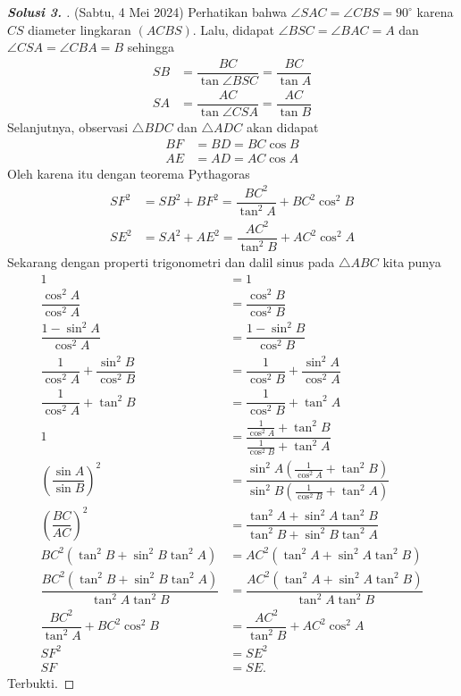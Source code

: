 \documentclass[letterpaper, 13pt]{scrartcl}
\begin{document}
\begin{proof}[\textbf{Solusi 3. }] (Sabtu, 4 Mei 2024)
Perhatikan bahwa $\angle SAC = \angle CBS = 90^\circ$ karena $CS$ diameter lingkaran $(ACBS)$. Lalu, didapat $\angle BSC = \angle BAC = A$ dan $\angle CSA = \angle CBA = B$ sehingga
\begin{align*}
    SB &= \dfrac{BC}{\tan \angle BSC} = \dfrac{BC}{\tan A}\\
    SA &= \dfrac{AC}{\tan \angle CSA} = \dfrac{AC}{\tan B}
\end{align*}
Selanjutnya, observasi $\triangle BDC$ dan $\triangle ADC$ akan didapat
\begin{align*}
    BF &= BD = BC \cos B\\
    AE &= AD = AC \cos A
\end{align*}
Oleh karena itu dengan teorema Pythagoras
\begin{align*}
    SF^2 &= SB^2 + BF^2 = \dfrac{BC^2}{\tan^2 A} + BC^2 \cos^2 B\\
    SE^2 &= SA^2 + AE^2 = \dfrac{AC^2}{\tan^2 B} + AC^2 \cos^2 A
\end{align*}
Sekarang dengan properti trigonometri dan dalil sinus pada $\triangle ABC$ kita punya
\begin{align*}
    1 &= 1\\
    \dfrac{\cos^2 A}{\cos^2 A} &= \dfrac{\cos^2 B}{\cos^2 B}\\
    \dfrac{1-\sin^2 A}{\cos^2 A} &= \dfrac{1-\sin^2 B}{\cos^2 B}\\
    \dfrac{1}{\cos^2 A}+\dfrac{\sin^2 B}{\cos^2 B} &= \dfrac{1}{\cos^2 B}+\dfrac{\sin^2 A}{\cos^2 A}\\
    \dfrac{1}{\cos^2 A}+\tan^2 B &= \dfrac{1}{\cos^2 B}+\tan^2 A\\
    1 &= \dfrac{\frac{1}{\cos^2 A}+\tan^2 B}{\frac{1}{\cos^2 B}+\tan^2 A}\\
    \left(\dfrac{\sin A}{\sin B}\right)^2 &= \dfrac{\sin^2 A\left(\frac{1}{\cos^2 A}+\tan^2 B\right)}{\sin^2 B\left(\frac{1}{\cos^2 B}+\tan^2 A\right)}\\
    \left(\dfrac{BC}{AC}\right)^2 &= \dfrac{\tan^2 A + \sin^2 A \tan^2 B}{\tan^2 B + \sin^2 B \tan^2 A}\\
    BC^2(\tan^2 B + \sin^2 B \tan^2 A) &= AC^2(\tan^2 A + \sin^2 A \tan^2 B)\\
    \dfrac{BC^2(\tan^2 B + \sin^2 B \tan^2 A)}{\tan^2 A \tan^2 B} &= \dfrac{AC^2(\tan^2 A + \sin^2 A \tan^2 B)}{\tan^2 A \tan^2 B}\\
    \dfrac{BC^2}{\tan^2 A} + BC^2 \cos^2 B &= \dfrac{AC^2}{\tan^2 B} + AC^2 \cos^2 A\\
    SF^2 &= SE^2\\
    SF &= SE.
\end{align*}
Terbukti.
\end{proof}
\end{document}
